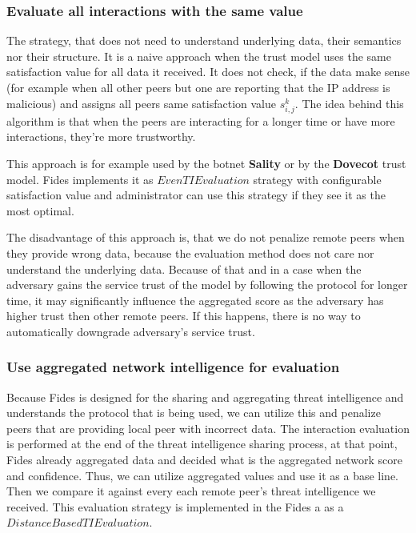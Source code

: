 \subsubsection{Evaluate all interactions with the same value}
\label{subsubsec:same-eval-for-all-interactions}
The strategy, that does not need to understand underlying data, their semantics nor their structure.
It is a naive approach when the trust model uses the same satisfaction value for all data it received. It does not check, if the data make sense (for example when all other peers but one are reporting that the IP address is malicious) and assigns all peers same satisfaction value $s^{k}_{i, j}$. 
The idea behind this algorithm is that when the peers are interacting for a longer time or have more interactions, they're more trustworthy.

This approach is for example used by the botnet \textbf{Sality} or by the \textbf{Dovecot} trust model. Fides implements it as $EvenTIEvaluation$ strategy with configurable satisfaction value and administrator can use this strategy if they see it as the most optimal.

The disadvantage of this approach is, that we do not penalize remote peers when they provide wrong data, because the evaluation method does not care nor understand the underlying data.
Because of that and in a case when the adversary gains the service trust of the model by following the protocol for longer time, it may significantly influence the aggregated score as the adversary has higher trust then other remote peers. If this happens, there is no way to automatically downgrade adversary's service trust.

\subsubsection{Use aggregated network intelligence for evaluation}
\label{subsub:distance-based-eval}
Because Fides is designed for the sharing and aggregating threat intelligence and understands the protocol that is being used, we can utilize this and penalize peers that are providing local peer with incorrect data.
The interaction evaluation is performed at the end of the threat intelligence sharing process, at that point, Fides already aggregated data and decided what is the aggregated network score and confidence. 
Thus, we can utilize aggregated values and use it as a base line. Then we compare it against every each remote peer's threat intelligence we received. This evaluation strategy is implemented in the Fides a as a $DistanceBasedTIEvaluation$.

